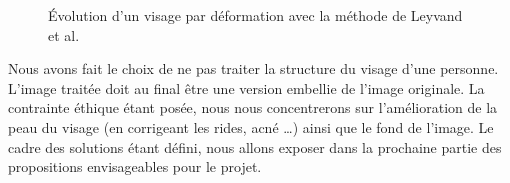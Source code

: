 \documentclass[11pt, french]{report-rd-info}
\begin{document}
\begin{figure}[htp]
 \centering
 \caption{Évolution d’un visage par déformation avec la méthode de Leyvand et al. \cite{Leyvand2008}}
 \label{fig:VisagesData}
\end{figure}

Nous avons fait le choix de ne pas traiter la structure du visage d’une personne. L’image traitée doit au final être une version embellie de l’image originale. La contrainte éthique étant posée,  nous nous concentrerons sur l’amélioration de la peau du visage (en corrigeant les rides, acné \ldots) ainsi que le fond de l’image.
Le cadre des solutions étant défini, nous allons exposer dans la prochaine partie des propositions envisageables pour le projet.
\end{document}
